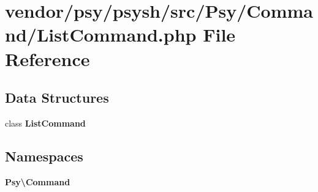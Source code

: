\section{vendor/psy/psysh/src/\+Psy/\+Command/\+List\+Command.php File Reference}
\label{psy_2psysh_2src_2_psy_2_command_2_list_command_8php}
\subsection*{Data Structures}
\begin{DoxyCompactItemize}
\item 
class {\bf List\+Command}
\end{DoxyCompactItemize}
\subsection*{Namespaces}
\begin{DoxyCompactItemize}
\item 
 {\bf Psy\textbackslash{}\+Command}
\end{DoxyCompactItemize}
